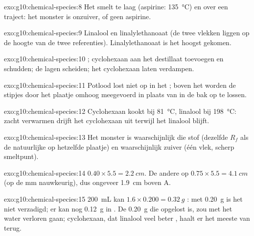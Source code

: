 \begin{solution}{exo:g10:chemical-species:8}
Het smelt te laag (aspirine: \qty{135}{\celsius}) en over een traject:
het monster is onzuiver, of geen aspirine.
\end{solution}

\begin{solution}{exo:g10:chemical-species:9}
Linalool en linalylethanoaat (de twee vlekken liggen op de hoogte van de
twee referenties). Linalylethanoaat is het hoogst gekomen.
\end{solution}

\begin{solution}{exo:g10:chemical-species:10}
; cyclohexaan aan het destillaat toevoegen en schudden;
de lagen scheiden; het cyclohexaan laten verdampen.
\end{solution}

\begin{solution}{exo:g10:chemical-species:11}
Potlood lost niet op in het ; boven het  worden de stipjes
door het plaatje omhoog meegevoerd in plaats van in de bak op te
lossen.
\end{solution}

\begin{solution}{exo:g10:chemical-species:12}
Cyclohexaan kookt bij \qty{81}{\celsius}, linalool bij \qty{198}{\celsius}:
zacht verwarmen drijft het cyclohexaan uit terwijl het linalool blijft.
\end{solution}

\begin{solution}{exo:g10:chemical-species:13}
Het monster is waarschijnlijk die stof (dezelfde $R_f$ als de natuurlijke
op hetzelfde plaatje) en waarschijnlijk zuiver (één vlek, scherp
smeltpunt).
\end{solution}

\begin{solution}{exo:g10:chemical-species:14}
$0.40 \times 5.5 = \qty{2.2}{cm}$. De andere op $0.75 \times 5.5 =
\qty{4.1}{cm}$ (op de mm nauwkeurig), dus ongeveer \qty{1.9}{cm} boven A.
\end{solution}

\begin{solution}{exo:g10:chemical-species:15}
\qty{200}{mL} kan $1.6 \times 0.200 = \qty{0.32}{g}$ : met
\qty{0.20}{g} is het niet verzadigd; er kan nog \qty{0.12}{g} in
. De \qty{0.20}{g} die opgelost is, zou met het water verloren
gaan; cyclohexaan, dat linalool veel beter , haalt er het meeste
van terug.
\end{solution}


